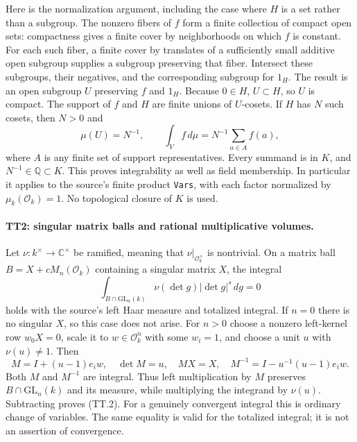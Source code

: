 Here is the normalization argument, including the case where $H$
is a set rather than a subgroup. The nonzero fibers of $f$ form a
finite collection of compact open sets: compactness gives a finite
cover by neighborhoods on which $f$ is constant. For each such fiber,
a finite cover by translates of a sufficiently small additive open
subgroup supplies a subgroup preserving that fiber. Intersect these
subgroups, their negatives, and the corresponding subgroup for
$1_H$. The result is an open subgroup $U$ preserving $f$ and $1_H$.
Because $0\in H$, $U\subset H$, so $U$ is compact. The support of
$f$ and $H$ are finite unions of $U$-cosets. If $H$ has $N$ such
cosets, then $N>0$ and
\[
 \mu(U)=N^{-1},\qquad
 \int_V f\,d\mu=N^{-1}\sum_{a\in A}f(a),                 \tag{TT.1}
\]
where $A$ is any finite set of support representatives. Every
summand is in $K$, and $N^{-1}\in\mathbb Q\subset K$.
This proves integrability as well as field membership. In
particular it applies to the source's finite product
\texttt{Vars}, with each factor normalized by
$\mu_k(\mathcal O_k)=1$. No topological closure of $K$ is used.

\paragraph{TT2: singular matrix balls and rational multiplicative volumes.}
Let $\nu:k^\times\to\mathbb C^\times$ be ramified, meaning that
$\nu|_{\mathcal O_k^\times}$ is nontrivial. On a matrix ball
$B=X+cM_n(\mathcal O_k)$ containing a singular matrix $X$, the
integral
\[
 \int_{B\cap\mathrm{GL}_n(k)}
       \nu(\det g)|\det g|^s\,dg=0                         \tag{TT.2}
\]
holds with the source's left Haar measure and totalized integral.
If $n=0$ there is no singular $X$, so this case does not arise.
For $n>0$ choose a nonzero left-kernel row $w_0X=0$, scale it to
$w\in\mathcal O_k^n$ with some $w_i=1$, and choose a unit $u$
with $\nu(u)\ne1$. Then
\[
 M=I+(u-1)e_iw,\quad \det M=u,\quad MX=X,\quad
 M^{-1}=I-u^{-1}(u-1)e_iw.                                 \tag{TT.3}
\]
Both $M$ and $M^{-1}$ are integral. Thus left multiplication by
$M$ preserves $B\cap\mathrm{GL}_n(k)$ and its measure, while
multiplying the integrand by $\nu(u)$. Subtracting proves (TT.2).
For a genuinely convergent integral this is ordinary change of
variables. The same equality is valid for the totalized integral;
it is not an assertion of convergence.

